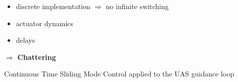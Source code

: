 \documentclass[12pt,svgnames,table,draft=false]{beamer}
\begin{document}
\begin{frame}\frametitle{}
\centering
\begin{tcolorbox}[colback=blue!5!white,colframe=blue!75!black,title=Clash with reality, width=20em,
standard jigsaw,
opacityback=.7]
\begin{itemize}
\item discrete implementation $\Rightarrow$ no infinite switching
\item actuator dynamics 
\item delays
\end{itemize}
\centering
$\Rightarrow$ \textbf{ Chattering} 
\end{tcolorbox}
\end{frame}

\usebackgroundtemplate{}
\begin{frame}
\centering
\Large
\vspace{3em}
Continuous Time Sliding Mode Control applied to the UAS guidance loop
\end{frame}
\end{document}
